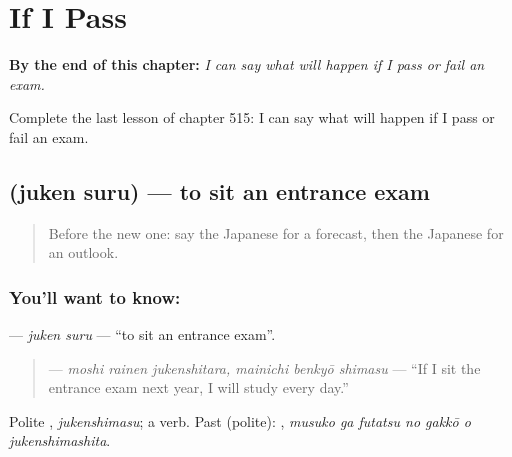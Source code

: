 
\chapter{If I Pass}
\label{ch:ja-if-i-pass}

\begin{chapteropening}
\textbf{By the end of this chapter:} \emph{I can say what will happen if I pass or fail an exam.}

Complete the last lesson of chapter 515: I can say what will happen if I pass or fail an exam.
\end{chapteropening}

\section[\texorpdfstring{\ja{じゅけんする} (juken suru)}{じゅけんする (juken suru)}]{ (juken suru) — to sit an entrance exam}

\label{lesson:JA-C515-juken-suru}



\begin{quote}
Before the new one: say the Japanese for a forecast, then the Japanese for an outlook.
\end{quote}

\subsection*{You'll want to know: }
\textbf{} — \emph{juken suru} — \textquotedblleft{}to sit an entrance exam\textquotedblright{}.

\begin{quote}
\textbf{   } — \emph{moshi rainen jukenshitara, mainichi benkyō shimasu} — \textquotedblleft{}If I sit the entrance exam next year, I will study every day.\textquotedblright{}
\end{quote}

Polite \textbf{}, \emph{jukenshimasu}; a  verb. Past (polite): \textbf{   }, \emph{musuko ga futatsu no gakkō o jukenshimashita}.

